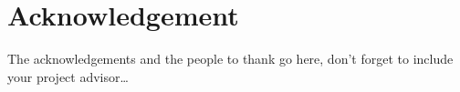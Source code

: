 \thispagestyle{empty}
\section*{Acknowledgement}

The acknowledgements and the people to thank go here, don't forget to include your project advisor\ldots

\newpage
\thispagestyle{empty}
\mbox{}
\newpage